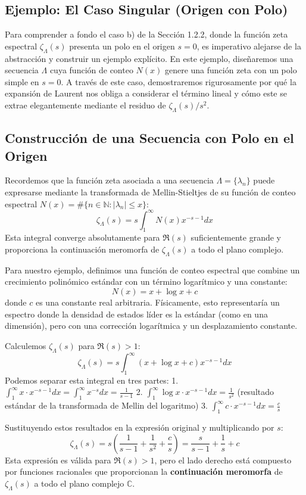 \subsection{Ejemplo: El Caso Singular (Origen con Polo)}

Para comprender a fondo el caso b) de la Sección 1.2.2, donde la función zeta espectral $\zeta_\Lambda(s)$ presenta un polo en el origen $s=0$, es imperativo alejarse de la abstracción y construir un ejemplo explícito. En este ejemplo, diseñaremos una secuencia $\Lambda$ cuya función de conteo $N(x)$ genere una función zeta con un polo simple en $s=0$. A través de este caso, demostraremos rigurosamente por qué la expansión de Laurent nos obliga a considerar el término lineal y cómo este se extrae elegantemente mediante el residuo de $\zeta_\Lambda(s)/s^2$.

\subsection{Construcción de una Secuencia con Polo en el Origen}

Recordemos que la función zeta asociada a una secuencia $\Lambda = \{\lambda_n\}$ puede expresarse mediante la transformada de Mellin-Stieltjes de su función de conteo espectral $N(x) = \#\{n \in \mathbb{N} : |\lambda_n| \le x\}$:
$$ \zeta_\Lambda(s) = s \int_1^\infty N(x) x^{-s-1} dx $$
Esta integral converge absolutamente para $\Re(s)$ suficientemente grande y proporciona la continuación meromorfa de $\zeta_\Lambda(s)$ a todo el plano complejo.

Para nuestro ejemplo, definimos una función de conteo espectral que combine un crecimiento polinómico estándar con un término logarítmico y una constante:
$$ N(x) = x + \log x + c $$
donde $c$ es una constante real arbitraria. Físicamente, esto representaría un espectro donde la densidad de estados líder es la estándar (como en una dimensión), pero con una corrección logarítmica y un desplazamiento constante.

Calculemos $\zeta_\Lambda(s)$ para $\Re(s) > 1$:
$$ \zeta_\Lambda(s) = s \int_1^\infty (x + \log x + c) x^{-s-1} dx $$
Podemos separar esta integral en tres partes:
1. $\int_1^\infty x \cdot x^{-s-1} dx = \int_1^\infty x^{-s} dx = \frac{1}{s-1}$
2. $\int_1^\infty \log x \cdot x^{-s-1} dx = \frac{1}{s^2}$ (resultado estándar de la transformada de Mellin del logaritmo)
3. $\int_1^\infty c \cdot x^{-s-1} dx = \frac{c}{s}$

Sustituyendo estos resultados en la expresión original y multiplicando por $s$:
$$ \zeta_\Lambda(s) = s \left( \frac{1}{s-1} + \frac{1}{s^2} + \frac{c}{s} \right) = \frac{s}{s-1} + \frac{1}{s} + c $$
Esta expresión es válida para $\Re(s) > 1$, pero el lado derecho está compuesto por funciones racionales que proporcionan la \textbf{continuación meromorfa} de $\zeta_\Lambda(s)$ a todo el plano complejo $\mathbb{C}$.

